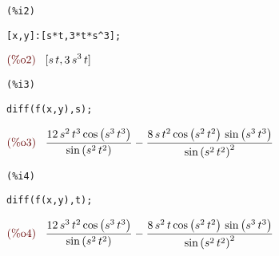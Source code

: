 \documentclass[12pt]{article}
\begin{document}
\noindent
\begin{minipage}[t]{8ex}{\color{red}\bf
\begin{verbatim}
(%i2) 
\end{verbatim}}
\end{minipage}
\begin{minipage}[t]{\textwidth}{\color{blue}
\begin{verbatim}
[x,y]:[s*t,3*t*s^3];
\end{verbatim}}
\end{minipage}
\begin{math}\displaystyle
\parbox{8ex}{\color{labelcolor}(\%o2) }
[s\,t,3\,{s}^{3}\,t]
\end{math}


\noindent
\begin{minipage}[t]{8ex}{\color{red}\bf
\begin{verbatim}
(%i3) 
\end{verbatim}}
\end{minipage}
\begin{minipage}[t]{\textwidth}{\color{blue}
\begin{verbatim}
diff(f(x,y),s);
\end{verbatim}}
\end{minipage}
\begin{math}\displaystyle
\parbox{8ex}{\color{labelcolor}(\%o3) }
\frac{12\,{s}^{2}\,{t}^{3}\,\mathrm{cos}\left( {s}^{3}\,{t}^{3}\right) }{\mathrm{sin}\left( {s}^{2}\,{t}^{2}\right) }-\frac{8\,s\,{t}^{2}\,\mathrm{cos}\left( {s}^{2}\,{t}^{2}\right) \,\mathrm{sin}\left( {s}^{3}\,{t}^{3}\right) }{{\mathrm{sin}\left( {s}^{2}\,{t}^{2}\right) }^{2}}
\end{math}


\noindent
\begin{minipage}[t]{8ex}{\color{red}\bf
\begin{verbatim}
(%i4) 
\end{verbatim}}
\end{minipage}
\begin{minipage}[t]{\textwidth}{\color{blue}
\begin{verbatim}
diff(f(x,y),t);
\end{verbatim}}
\end{minipage}
\begin{math}\displaystyle
\parbox{8ex}{\color{labelcolor}(\%o4) }
\frac{12\,{s}^{3}\,{t}^{2}\,\mathrm{cos}\left( {s}^{3}\,{t}^{3}\right) }{\mathrm{sin}\left( {s}^{2}\,{t}^{2}\right) }-\frac{8\,{s}^{2}\,t\,\mathrm{cos}\left( {s}^{2}\,{t}^{2}\right) \,\mathrm{sin}\left( {s}^{3}\,{t}^{3}\right) }{{\mathrm{sin}\left( {s}^{2}\,{t}^{2}\right) }^{2}}
\end{math}
\end{document}
